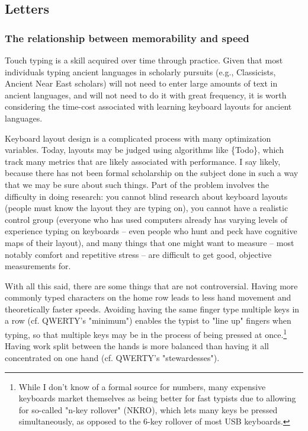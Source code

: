 \documentclass[11pt]{article}
\begin{document}
\subsection{Letters}
\label{sec:orgd003279}

\subsubsection{The relationship between memorability and speed}
\label{sec:org7ef682b}

Touch typing is a skill acquired over time through practice. Given that most individuals typing ancient languages in scholarly pursuits (e.g., Classicists, Ancient Near East scholars) will not need to enter large amounts of text in ancient languages, and will not need to do it with great frequency, it is worth considering the time-cost associated with learning keyboard layouts for ancient languages.

Keyboard layout design is a complicated process with many optimization variables. Today, layouts may be judged using algorithms like \{Todo\}, which track many metrics that are likely associated with performance. I say likely, because there has not been formal scholarship on the subject done in such a way that we may be sure about such things. Part of the problem involves the difficulty in doing research: you cannot blind research about keyboard layouts (people must know the layout they are typing on), you cannot have a realistic control group (everyone who has used computers already has varying levels of experience typing on keyboards -- even people who hunt and peck have cognitive maps of their layout), and many things that one might want to measure -- most notably comfort and repetitive stress -- are difficult to get good, objective measurements for.

With all this said, there are some things that are not controversial. Having more commonly typed characters on the home row leads to less hand movement and theoretically faster speeds. Avoiding having the same finger type multiple keys in a row (cf. QWERTY's "minimum") enables the typist to "line up" fingers when typing, so that multiple keys may be in the process of being pressed at once.\footnote{While I don't know of a formal source for numbers, many expensive keyboards market themselves as being better for fast typists due to allowing for so-called "n-key rollover" (NKRO), which lets many keys be pressed simultaneously, as opposed to the 6-key rollover of most USB keyboards.} Having work split between the hands is more balanced than having it all concentrated on one hand (cf. QWERTY's "stewardesses").
\end{document}

